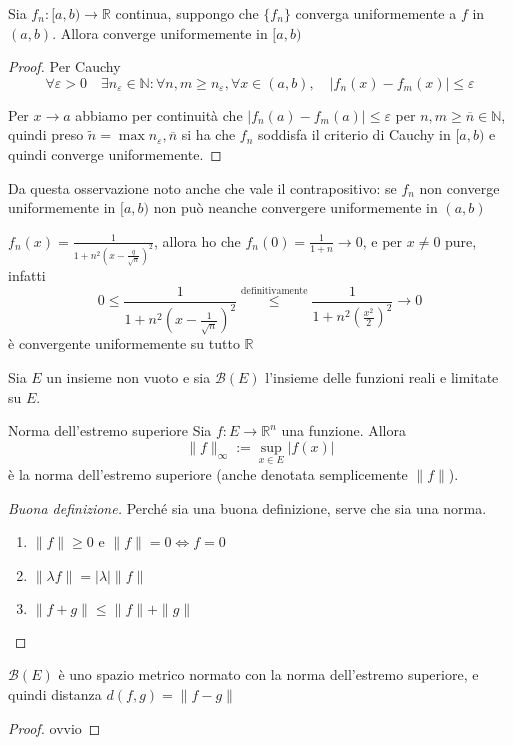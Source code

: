 \begin{remark}
    Sia \(f_{n}: [a, b) \to  \mathbb{R}\) continua, suppongo che \(\{f_{n}\} \)
    converga uniformemente a \(f\) in \((a, b)\). Allora converge uniformemente
    in \([a, b)\) 
\end{remark}
\begin{proof}
    Per Cauchy
    \[
        \forall \varepsilon > 0 \quad \exists n_\varepsilon \in \mathbb{N} :
        \forall  n, m \ge n_\varepsilon, \forall x \in (a, b), \quad |f_{n}(x) -
        f_{m}(x)| \le \varepsilon
    \]

    Per \(x \to  a\) abbiamo per continuità che \(|f_{n}(a) - f_{m}(a)| \le
    \varepsilon\) per \(n, m \ge \overline{n} \in \mathbb{N}\), quindi preso
    \(\tilde{n} = \max{n_\varepsilon, \overline{n}}\) si ha che \(f_{n}\)
    soddisfa il criterio di Cauchy in \([a, b)\) e quindi converge
    uniformemente.
\end{proof}
Da questa osservazione noto anche che vale il contrapositivo: se \(f_{n}\) non
converge uniformemente in \([a, b)\) non può neanche convergere uniformemente in
\((a, b)\)
\begin{example}
    \(\displaystyle f_{n}(x) = \frac{1}{1 + {n^2 \left( x - \frac{q}{\sqrt{n}}
\right)}^2}\), allora ho che \(\displaystyle f_{n}(0) = \frac{1}{1+n} \to 0\), e
per \(x \neq 0\) pure, infatti
\[
    0 \le \frac{1}{1+ n^2 {\left( x - \frac{1}{\sqrt{n}} \right)}^2}
    \overset{\text{definitivamente}}{\le} \frac{1}{1 + n^2 {\left(
    \frac{x^2}{2} \right) }^2} \to 0
\]
è convergente uniformemente su tutto \(\mathbb{R}\)
\end{example}
Sia \(E\) un insieme non vuoto e sia \(\mathcal{B}(E)\) l'insieme delle funzioni
reali e limitate su \(E\).
\begin{definition}{Norma dell'estremo superiore}
    Sia \(f : E \to \mathbb{R}^{n}\) una funzione. Allora
    \[
        \|f \|_{\infty} := \sup_{x \in E} |f(x)| 
    \]
    è la norma dell'estremo superiore (anche denotata semplicemente \(\|f\|\)).
\end{definition}
\begin{proof}[Buona definizione]
Perché sia una buona definizione, serve che sia una norma. 
\begin{enumerate}[label = \alph*.]
    \item \(\|f\| \ge 0\) e \(\|f\| = 0 \iff f = 0\)
    \item \(\|\lambda f\| = |\lambda| \|f\|\)
    \item \(\|f + g\| \le \|f\| + \|g\|\)
\end{enumerate}
\end{proof}
\begin{proposition}
    \(\mathcal{B}(E)\) è uno spazio metrico normato con la norma dell'estremo
    superiore, e quindi distanza \(d(f, g) = \|f - g\|\) 
\end{proposition}
\begin{proof}
    ovvio
\end{proof}

